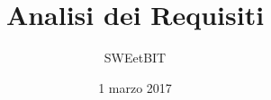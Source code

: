



\usepackage[utf8]{inputenc}

\title{\textbf{Analisi dei Requisiti}}
\author{SWEetBIT}

\date{1 marzo 2017}




\makeFrontPage

\tableofcontents




